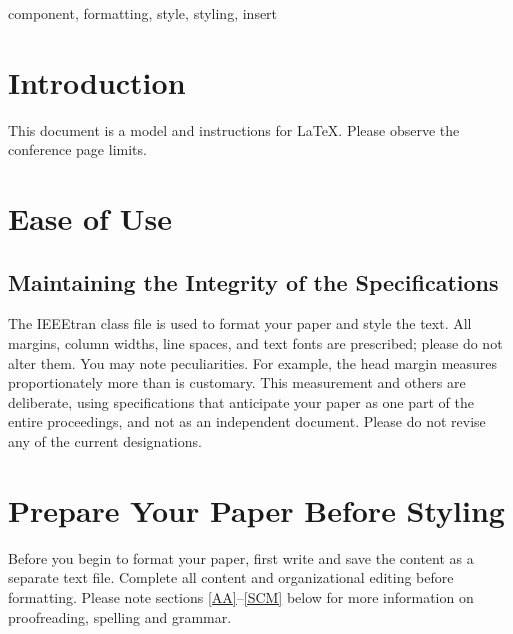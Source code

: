 \documentclass[
  twoside,
  openright,
  degree    = master,               %
  language  = english,              %
  fontset   = template,             %
  watermark = true,                 %
  doi       = true,                 %
]{ncs-ieee-conference}
\begin{document}
\begin{abstract}
  This document is a model and instructions for \LaTeX.
  This and the IEEEtran.cls file define the components of your paper [title, text, heads, etc.]. *CRITICAL: Do Not Use Symbols, Special Characters, Footnotes,
  This and the IEEEtran.cls file define the components of your paper [title, text, heads, etc.]. *CRITICAL: Do Not Use Symbols, Special Characters, Footnotes,
  This and the IEEEtran.cls file define the components of your paper [title, text, heads, etc.]. *CRITICAL: Do Not Use Symbols, Special Characters, Footnotes,
  or Math in Paper Title or Abstract.
\end{abstract}

\begin{IEEEkeywords}
  component, formatting, style, styling, insert
\end{IEEEkeywords}

\section{Introduction}
This document is a model and instructions for \LaTeX.
Please observe the conference page limits.

\section{Ease of Use}

\subsection{Maintaining the Integrity of the Specifications}

The IEEEtran class file is used to format your paper and style the text. All margins,
column widths, line spaces, and text fonts are prescribed; please do not
alter them. You may note peculiarities. For example, the head margin
measures proportionately more than is customary. This measurement
and others are deliberate, using specifications that anticipate your paper
as one part of the entire proceedings, and not as an independent document.
Please do not revise any of the current designations.

\section{Prepare Your Paper Before Styling}
Before you begin to format your paper, first write and save the content as a
separate text file. Complete all content and organizational editing before
formatting. Please note sections \ref{AA}--\ref{SCM} below for more information on
proofreading, spelling and grammar.
\end{document}
